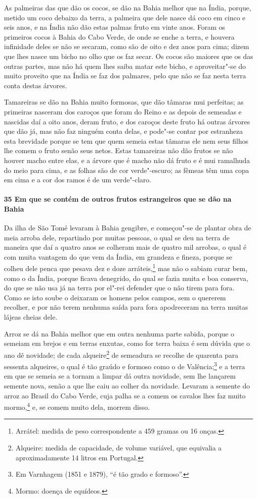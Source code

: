 As palmeiras das que dão os cocos, se dão na Bahia melhor que na Índia, porque, metido um
coco debaixo da terra, a palmeira que dele nasce dá coco em cinco e seis anos, e na Índia
não dão estas palmas fruto em vinte anos. Foram os primeiros cocos à Bahia do Cabo Verde,
de onde se enche a terra, e houvera infinidade deles se não se secaram, como são de oito e
dez anos para cima; dizem que lhes nasce um bicho no olho que os faz secar. Os cocos são
maiores que os das outras partes, mas não há quem lhes saiba matar este bicho, e
aproveitar"-se do muito proveito que na Índia se faz dos palmares, pelo que não se faz
nesta terra conta destas árvores.

Tamareiras se dão na Bahia muito formosas, que dão tâmaras mui perfeitas; as primeiras
nasceram dos caroços que foram do Reino e as depois de semeadas e nascidas daí a oito
anos, deram fruto, e dos caroços deste fruto há outras árvores que dão já, mas não faz
ninguém conta delas, e pode"-se contar por estranheza esta brevidade porque se tem que quem
semeia estas tâmaras ele nem seus filhos lhe comem o fruto senão seus netos. Estas
tamareiras não dão frutos se não houver macho entre elas, e a árvore que é macho não dá
fruto e é mui ramalhuda do meio para cima, e as folhas são de cor verde"-escuro; as fêmeas
têm uma copa em cima e a cor dos ramos é de um verde"-claro.

\paragraph{35 Em que se contém de outros frutos estrangeiros que se dão na Bahia}

Da ilha de São Tomé levaram à Bahia gengibre, e começou"-se de plantar obra de meia arroba
dele, repartindo por muitas pessoas, o qual se deu na terra de maneira que daí a quatro
anos se colheram mais de quatro mil arrobas, o qual é com muita vantagem do que vem da
Índia, em grandeza e fineza, porque se colheu dele penca que pesava dez e doze
arráteis,\footnote{ Arrátel: medida de peso correspondente a 459 gramas ou 16 onças.} mas
não o sabiam curar bem, como o da Índia, porque ficava denegrido, do qual se fazia muita e
boa conserva, do que se não usa já na terra por el"-rei defender que o não tirem para fora.
Como se isto soube o deixaram os homens pelos campos, sem o quererem recolher, e por não
terem nenhuma saída para fora apodreceram na terra muitas lájeas cheias dele.

Arroz se dá na Bahia melhor que em outra nenhuma parte sabida, porque o semeiam em brejos
e em terras enxutas, como for terra baixa é sem dúvida que o ano dê novidade; de cada
alqueire\footnote{ Alqueire: medida de capacidade, de volume variável, que equivalia a
aproximadamente 14 litros em Portugal.} de semeadura se recolhe de quarenta para sessenta
alqueires, o qual é tão graúdo e formoso como o de Valência;\footnote{ Em Varnhagem (1851
e 1879), ``é tão grado e formoso''.} e a terra em que se semeia se a tornam a limpar dá
outra novidade, sem lhe lançarem semente nova, senão a que lhe caiu ao colher da novidade.
Levaram a semente do arroz ao Brasil do Cabo Verde, cuja palha se a comem os cavalos lhes
faz muito mormo,\footnote{ Mormo: doença de equídeos.} e, se comem muito dela, morrem disso.

